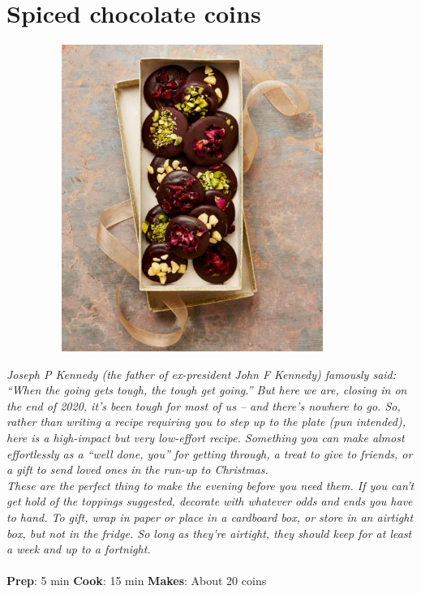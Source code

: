 \documentclass{book}
\begin{document}
\section{Spiced chocolate coins}
\begin{figure}
\centering\includegraphics[width=10cm,height=10cm,keepaspectratio]{Recipe_Pictures/Spiced_chocolate_coins.png}
\end{figure}
\emph{Joseph P Kennedy (the father of ex-president John F Kennedy) famously said: “When the going gets tough, the tough get going.” But here we are, closing in on the end of 2020, it’s been tough for most of us – and there’s nowhere to go. So, rather than writing a recipe requiring you to step up to the plate (pun intended), here is a high-impact but very low-effort recipe. Something you can make almost effortlessly as a “well done, you” for getting through, a treat to give to friends, or a gift to send loved ones in the run-up to Christmas.\\ 
These are the perfect thing to make the evening before you need them. If you can’t get hold of the toppings suggested, decorate with whatever odds and ends you have to hand. To gift, wrap in paper or place in a cardboard box, or store in an airtight box, but not in the fridge. So long as they’re airtight, they should keep for at least a week and up to a fortnight.}\\\\ 
\textbf{Prep}: 5 min
\textbf{Cook}: 15 min
\textbf{Makes}: About 20 coins
\end{document}
